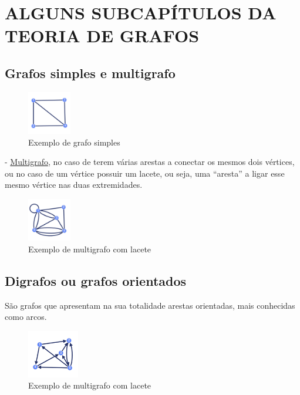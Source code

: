 \section{ALGUNS SUBCAPÍTULOS DA TEORIA DE GRAFOS}
\subsection{Grafos simples e multigrafo}
\begin{figure}[h]
    \centering
    \includegraphics[width=0.17\textwidth]{imgs/Figura3}
    \caption{Exemplo de grafo simples\label{fig:imagem3}}
\end{figure}
\linebreak
- \underline{Multigrafo}, no caso de terem várias arestas a conectar os mesmos dois vértices, ou no caso de um vértice possuir um lacete, ou seja, uma “aresta” a ligar esse mesmo vértice nas duas extremidades.
\begin{figure}[h]
    \centering
    \includegraphics[width=0.17\textwidth]{imgs/Figura4}
    \caption{Exemplo de multigrafo com lacete\label{fig:imagem4}}
\end{figure}
\linebreak
{}

\subsection{Digrafos ou grafos orientados}
São grafos que apresentam na sua totalidade arestas orientadas, mais conhecidas como arcos.
\linebreak
\begin{figure}[h]
    \centering
    \includegraphics[width=0.2\textwidth]{imgs/Figura5}
    \caption{Exemplo de multigrafo com lacete\label{fig:imagem5}}
\end{figure}


